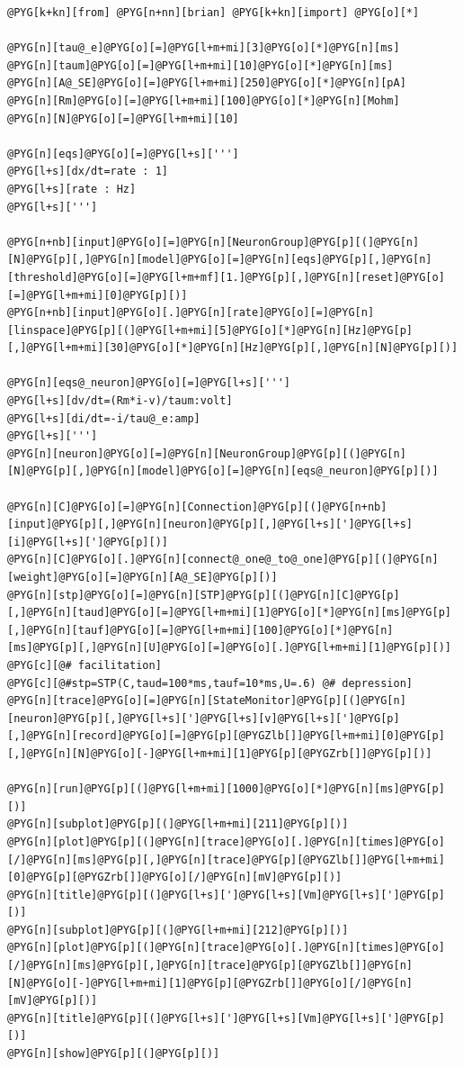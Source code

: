 \documentclass[letterpaper,10pt,english]{manual}
\begin{document}
\begin{Verbatim}[commandchars=@\[\]]
@PYG[k+kn][from] @PYG[n+nn][brian] @PYG[k+kn][import] @PYG[o][*]

@PYG[n][tau@_e]@PYG[o][=]@PYG[l+m+mi][3]@PYG[o][*]@PYG[n][ms]
@PYG[n][taum]@PYG[o][=]@PYG[l+m+mi][10]@PYG[o][*]@PYG[n][ms]
@PYG[n][A@_SE]@PYG[o][=]@PYG[l+m+mi][250]@PYG[o][*]@PYG[n][pA]
@PYG[n][Rm]@PYG[o][=]@PYG[l+m+mi][100]@PYG[o][*]@PYG[n][Mohm]
@PYG[n][N]@PYG[o][=]@PYG[l+m+mi][10]

@PYG[n][eqs]@PYG[o][=]@PYG[l+s][''']
@PYG[l+s][dx/dt=rate : 1]
@PYG[l+s][rate : Hz]
@PYG[l+s][''']

@PYG[n+nb][input]@PYG[o][=]@PYG[n][NeuronGroup]@PYG[p][(]@PYG[n][N]@PYG[p][,]@PYG[n][model]@PYG[o][=]@PYG[n][eqs]@PYG[p][,]@PYG[n][threshold]@PYG[o][=]@PYG[l+m+mf][1.]@PYG[p][,]@PYG[n][reset]@PYG[o][=]@PYG[l+m+mi][0]@PYG[p][)]
@PYG[n+nb][input]@PYG[o][.]@PYG[n][rate]@PYG[o][=]@PYG[n][linspace]@PYG[p][(]@PYG[l+m+mi][5]@PYG[o][*]@PYG[n][Hz]@PYG[p][,]@PYG[l+m+mi][30]@PYG[o][*]@PYG[n][Hz]@PYG[p][,]@PYG[n][N]@PYG[p][)]

@PYG[n][eqs@_neuron]@PYG[o][=]@PYG[l+s][''']
@PYG[l+s][dv/dt=(Rm*i-v)/taum:volt]
@PYG[l+s][di/dt=-i/tau@_e:amp]
@PYG[l+s][''']
@PYG[n][neuron]@PYG[o][=]@PYG[n][NeuronGroup]@PYG[p][(]@PYG[n][N]@PYG[p][,]@PYG[n][model]@PYG[o][=]@PYG[n][eqs@_neuron]@PYG[p][)]

@PYG[n][C]@PYG[o][=]@PYG[n][Connection]@PYG[p][(]@PYG[n+nb][input]@PYG[p][,]@PYG[n][neuron]@PYG[p][,]@PYG[l+s][']@PYG[l+s][i]@PYG[l+s][']@PYG[p][)]
@PYG[n][C]@PYG[o][.]@PYG[n][connect@_one@_to@_one]@PYG[p][(]@PYG[n][weight]@PYG[o][=]@PYG[n][A@_SE]@PYG[p][)]
@PYG[n][stp]@PYG[o][=]@PYG[n][STP]@PYG[p][(]@PYG[n][C]@PYG[p][,]@PYG[n][taud]@PYG[o][=]@PYG[l+m+mi][1]@PYG[o][*]@PYG[n][ms]@PYG[p][,]@PYG[n][tauf]@PYG[o][=]@PYG[l+m+mi][100]@PYG[o][*]@PYG[n][ms]@PYG[p][,]@PYG[n][U]@PYG[o][=]@PYG[o][.]@PYG[l+m+mi][1]@PYG[p][)] @PYG[c][@# facilitation]
@PYG[c][@#stp=STP(C,taud=100*ms,tauf=10*ms,U=.6) @# depression]
@PYG[n][trace]@PYG[o][=]@PYG[n][StateMonitor]@PYG[p][(]@PYG[n][neuron]@PYG[p][,]@PYG[l+s][']@PYG[l+s][v]@PYG[l+s][']@PYG[p][,]@PYG[n][record]@PYG[o][=]@PYG[p][@PYGZlb[]]@PYG[l+m+mi][0]@PYG[p][,]@PYG[n][N]@PYG[o][-]@PYG[l+m+mi][1]@PYG[p][@PYGZrb[]]@PYG[p][)]

@PYG[n][run]@PYG[p][(]@PYG[l+m+mi][1000]@PYG[o][*]@PYG[n][ms]@PYG[p][)]
@PYG[n][subplot]@PYG[p][(]@PYG[l+m+mi][211]@PYG[p][)]
@PYG[n][plot]@PYG[p][(]@PYG[n][trace]@PYG[o][.]@PYG[n][times]@PYG[o][/]@PYG[n][ms]@PYG[p][,]@PYG[n][trace]@PYG[p][@PYGZlb[]]@PYG[l+m+mi][0]@PYG[p][@PYGZrb[]]@PYG[o][/]@PYG[n][mV]@PYG[p][)]
@PYG[n][title]@PYG[p][(]@PYG[l+s][']@PYG[l+s][Vm]@PYG[l+s][']@PYG[p][)]
@PYG[n][subplot]@PYG[p][(]@PYG[l+m+mi][212]@PYG[p][)]
@PYG[n][plot]@PYG[p][(]@PYG[n][trace]@PYG[o][.]@PYG[n][times]@PYG[o][/]@PYG[n][ms]@PYG[p][,]@PYG[n][trace]@PYG[p][@PYGZlb[]]@PYG[n][N]@PYG[o][-]@PYG[l+m+mi][1]@PYG[p][@PYGZrb[]]@PYG[o][/]@PYG[n][mV]@PYG[p][)]
@PYG[n][title]@PYG[p][(]@PYG[l+s][']@PYG[l+s][Vm]@PYG[l+s][']@PYG[p][)]
@PYG[n][show]@PYG[p][(]@PYG[p][)]
\end{Verbatim}
\end{document}
